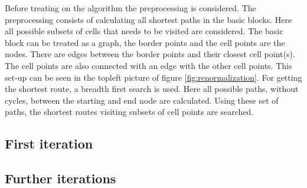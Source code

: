 Before treating on the algorithm the preprocessing is considered.  The preprocessing consists of calculating all shortest paths in the basic blocks. Here all possible subsets of cells that needs to be visited are considered.
\newline\newline\noindent
The basic block can be treated as a graph, the border points and the cell points are the nodes. There are edges between the border points and their closest cell point(s). The cell points are also connected with an edge with the other cell points. This set-up can be seen in the topleft picture of figure \ref{fig:renormalization}. For getting the shortest route, a breadth first search is used. Here all possible paths, without cycles, between the starting and end node are calculated. Using these set of paths, the shortest routes visiting subsets of cell points are searched.
\subsection{First iteration}
\subsection{Further iterations}
